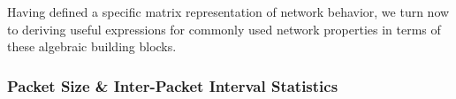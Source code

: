 \documentclass[twocolumn,final]{svjour3}
\begin{document}
Having defined a specific matrix representation of network behavior,
we turn now to deriving useful expressions for commonly used network properties in terms of these algebraic building blocks.

\subsubsection{Packet Size \& Inter-Packet Interval Statistics}
\label{sec:flow-totals}

\end{document}

